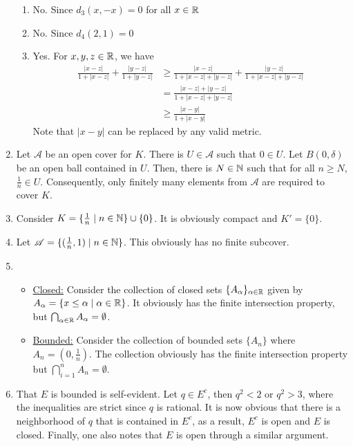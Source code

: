 \begin{enumerate}
\begin{enumerate}[label=(\roman*)]
    \item No. Since $d_3(x, -x) = 0$ for all $x\in\mathbb{R}$

    \item No. Since $d_4(2,1) = 0$

    \item Yes. For $x,y,z\in\mathbb{R}$, we have 
    \begin{align*}
        \frac{|x - z|}{1 + |x - z|} + \frac{|y - z|}{1 + |y - z|} &\ge\frac{|x - z|}{1 + |x - z| + |y - z|} + \frac{|y - z|}{1 + |x - z| + |y - z|}\\
        &= \frac{|x - z| + |y - z|}{1 + |x - z| + |y - z|}\\
        &\ge\frac{|x - y|}{1 + |x - y|}
    \end{align*}
    Note that $|x - y|$ can be replaced by any valid metric.
\end{enumerate}

\item Let $\mathscr A$ be an open cover for $K$. There is $U\in\mathscr A$ such that $0\in U$. Let $B(0,\delta)$ be an open ball contained in $U$. Then, there is $N\in\mathbb{N}$ such that for all $n\ge N$, $\frac{1}{n}\in U$. Consequently, only finitely many elements from $\mathscr A$ are required to cover $K$.

\item Consider $K = \{\frac{1}{n}\mid n\in\mathbb{N}\}\cup\{0\}$. It is obviously compact and $K'= \{0\}$.

\item Let $\mathscr A = \{(\frac{1}{n}, 1)\mid n\in\mathbb{N}\}$. This obviously has no finite subcover.

\item 
\begin{itemize}
    \item \underline{Closed:} Consider the collection of closed sets $\{A_\alpha\}_{\alpha\in\mathbb{R}}$ given by $A_\alpha = \{x\le\alpha\mid\alpha\in\mathbb{R}\}$. It obviously has the finite intersection property, but $\bigcap_{\alpha\in\mathbb{R}}A_\alpha = \emptyset$.

    \item \underline{Bounded:} Consider the collection of bounded sets $\{A_n\}$ where $A_n = \left(0,\frac{1}{n}\right)$. The collection obviously has the finite intersection property but $\bigcap_{i = 1}^nA_n = \emptyset$.
\end{itemize}

\item That $E$ is bounded is self-evident. Let $q\in E^c$, then $q^2 < 2$ or $q^2 > 3$, where the inequalities are strict since $q$ is rational. It is now obvious that there is a neighborhood of $q$ that is contained in $E^c$, as a result, $E^c$ is open and $E$ is closed. Finally, one also notes that $E$ is open through a similar argument.


\end{enumerate}
